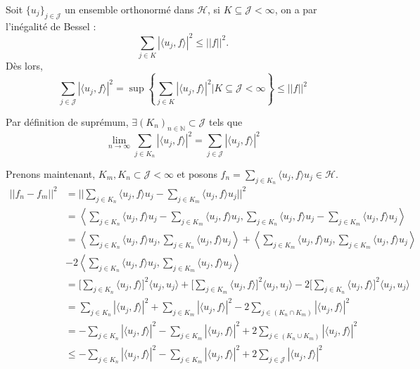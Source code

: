 Soit $\{u_j\}_{j\in\mathcal{J}}$ un ensemble orthonormé dans $\mathcal{H}$, si $K\subseteq\mathcal{J}<\infty$, on a par l'inégalité de Bessel : 
\begin{equation*}
    \sum\limits_{j\in K}|\langle u_j,f\rangle|^2 \leq ||f||^2.
\end{equation*}
Dès lors, 
\begin{equation*}
    \sum\limits_{j\in \mathcal{J}}|\langle u_j,f\rangle|^2 = \sup\left\{\sum_{j\in K} |\langle u_j,f\rangle|^2 \big| K\subseteq \mathcal{J} < \infty\right\} \leq ||f||^2
\end{equation*}

Par définition de suprémum, $\exists (K_n)_{n\in\mathbb{N}}\subset \mathcal{J}$ tels que
\begin{equation*}
    \lim_{n\to\infty} \sum_{j\in K_n} |\langle u_j,f\rangle|^2 = \sum_{j\in\mathcal{J}} |\langle u_j,f\rangle|^2
\end{equation*}

Prenons maintenant, $K_m,K_n \subset \mathcal{J} < \infty$ et posons $f_n = \sum_{j\in K_n} \langle u_j,f\rangle u_j \in \mathcal{H}$.
\begin{align*}
    ||f_n-f_m||^2 & = ||\sum_{j\in K_n} \langle u_j,f\rangle u_j - \sum_{j\in K_m} \langle u_j,f\rangle u_j||^2\\
    & = \left\langle \sum_{j\in K_n} \langle u_j,f\rangle u_j - \sum_{j\in K_m} \langle u_j,f\rangle u_j , \sum_{j\in K_n} \langle u_j,f\rangle u_j - \sum_{j\in K_m} \langle u_j,f\rangle u_j\right\rangle\\
    & = \left\langle \sum_{j\in K_n} \langle u_j,f\rangle u_j,\sum_{j\in K_n} \langle u_j,f\rangle u_j\right\rangle + \left\langle \sum_{j\in K_m} \langle u_j,f\rangle u_j ,  \sum_{j\in K_m} \langle u_j,f\rangle u_j \right\rangle\\
    & - 2\left\langle \sum_{j\in K_n} \langle u_j,f\rangle u_j ,  \sum_{j\in K_m} \langle u_j,f\rangle u_j \right\rangle\\
    & = \Big[\sum_{j\in K_n} \langle u_j,f\rangle\Big]^2 \langle u_j,u_j\rangle + \Big[\sum_{j\in K_m} \langle u_j,f\rangle\Big]^2 \langle u_j,u_j\rangle - 2 \Big[\sum_{j\in K_n} \langle u_j,f\rangle\Big]^2 \langle u_j,u_j\rangle\\
    & = \sum_{j\in K_n} |\langle u_j,f\rangle|^2 + \sum_{j\in K_m} |\langle u_j,f\rangle|^2 - 2 \sum_{j\in (K_n \cap K_m)} |\langle u_j,f\rangle|^2\\
    & = -\sum_{j\in K_n} |\langle u_j,f\rangle|^2 - \sum_{j\in K_m} |\langle u_j,f\rangle|^2 + 2 \sum_{j\in (K_n \cup K_m)} |\langle u_j,f\rangle|^2\\
    & \leq  -\sum_{j\in K_n} |\langle u_j,f\rangle|^2 - \sum_{j\in K_m} |\langle u_j,f\rangle|^2 + 2 \sum_{j\in \mathcal{J}} |\langle u_j,f\rangle|^2
\end{align*}

